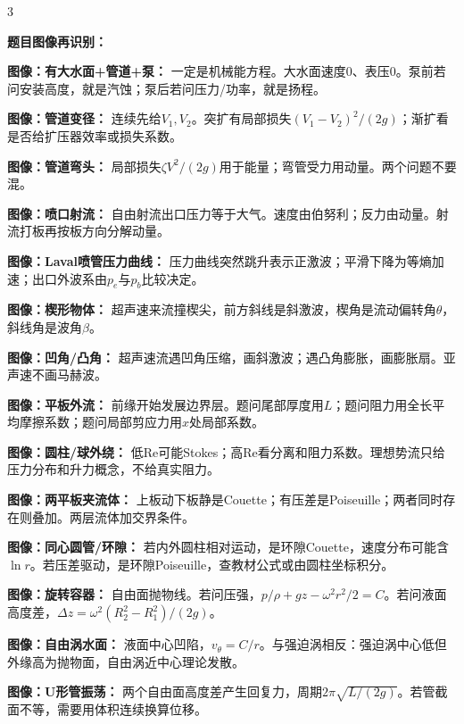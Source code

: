 \documentclass[a4paper]{article}
\newcommand{\sect}[1]{\par{\bfseries\color{Q}#1：}}
\newcommand{\miniimg}[2]{}
\begin{document}
\begin{multicols}{3}
{\sect{题目图像再识别}
\miniimg{0.98}{assets/original_problem_schematics_generic.png}
\sect{图像：有大水面+管道+泵}
一定是机械能方程。大水面速度0、表压0。泵前若问安装高度，就是汽蚀；泵后若问压力/功率，就是扬程。
\sect{图像：管道变径}
连续先给$V_1,V_2$。突扩有局部损失$(V_1-V_2)^2/(2g)$；渐扩看是否给扩压器效率或损失系数。
\sect{图像：管道弯头}
局部损失$\zeta V^2/(2g)$用于能量；弯管受力用动量。两个问题不要混。
\sect{图像：喷口射流}
自由射流出口压力等于大气。速度由伯努利；反力由动量。射流打板再按板方向分解动量。
\sect{图像：Laval喷管压力曲线}
压力曲线突然跳升表示正激波；平滑下降为等熵加速；出口外波系由$p_e$与$p_b$比较决定。
\sect{图像：楔形物体}
超声速来流撞楔尖，前方斜线是斜激波，楔角是流动偏转角$\theta$，斜线角是波角$\beta$。
\sect{图像：凹角/凸角}
超声速流遇凹角压缩，画斜激波；遇凸角膨胀，画膨胀扇。亚声速不画马赫波。
\sect{图像：平板外流}
前缘开始发展边界层。题问尾部厚度用$L$；题问阻力用全长平均摩擦系数；题问局部剪应力用$x$处局部系数。
\sect{图像：圆柱/球外绕}
低Re可能Stokes；高Re看分离和阻力系数。理想势流只给压力分布和升力概念，不给真实阻力。
\sect{图像：两平板夹流体}
上板动下板静是Couette；有压差是Poiseuille；两者同时存在则叠加。两层流体加交界条件。
\sect{图像：同心圆管/环隙}
若内外圆柱相对运动，是环隙Couette，速度分布可能含$\ln r$。若压差驱动，是环隙Poiseuille，查教材公式或由圆柱坐标积分。
\sect{图像：旋转容器}
自由面抛物线。若问压强，$p/\rho+gz-\omega^2r^2/2=C$。若问液面高度差，$\Delta z=\omega^2(R_2^2-R_1^2)/(2g)$。
\sect{图像：自由涡水面}
液面中心凹陷，$v_\theta=C/r$。与强迫涡相反：强迫涡中心低但外缘高为抛物面，自由涡近中心理论发散。
\sect{图像：U形管振荡}
两个自由面高度差产生回复力，周期$2\pi\sqrt{L/(2g)}$。若管截面不等，需要用体积连续换算位移。

}
\end{multicols}
\end{document}
